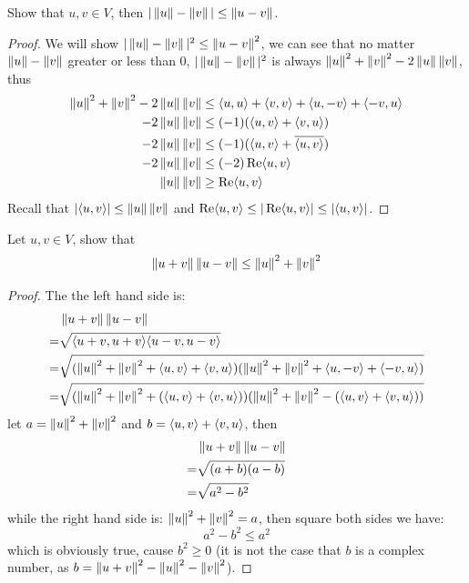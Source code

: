 \documentclass[../main.tex]{subfiles}
\begin{document}
\setcounter{exercise}{19}
\begin{exercise}
  Show that $u, v \in V$, then $|\norm{u} - \norm{v}| \le \norm{u - v}$.
\end{exercise}
\begin{proof}
  We will show $|\norm{u} - \norm{v}|^2 \le \norm{u - v}^2$,
  we can see that no matter $\norm{u} - \norm{v}$ greater or less than $0$,
  $|\norm{u} - \norm{v}|^2$ is always $\norm{u}^2 + \norm{v}^2 - 2\norm{u}\norm{v}$,
  thus
  \begin{align*}
    \norm{u}^2 + \norm{v}^2 - 2\norm{u}\norm{v} & \le \ip{u}{u} + \ip{v}{v} + \ip{u}{- v} + \ip{- v}{u} \\
    - 2\norm{u}\norm{v} & \le (-1) (\ip{u}{v} + \ip{v}{u}) \\
    - 2\norm{u}\norm{v} & \le (-1) (\ip{u}{v} + \overline{\ip{u}{v}}) \\
    - 2\norm{u}\norm{v} & \le (-2) \real \ip{u}{v} \\
    \norm{u}\norm{v} & \ge \real \ip{u}{v} \\
  \end{align*}
  Recall that $|\ip{u}{v}| \le \norm{u}\norm{v}$ and $\real \ip{u}{v} \le |\real \ip{u}{v}| \le |\ip{u}{v}|$.
\end{proof}

\setcounter{exercise}{21}
\begin{exercise}
  Let $u, v \in V$, show that
  \[
  \norm{u + v} \norm{u - v} \le \norm{u}^2 + \norm{v}^2
  \]
\end{exercise}
\begin{proof}
  The the left hand side is:
  \begin{align*}
     & \norm{u + v} \norm{u - v} \\
    =& \sqrt{\ip{u + v}{u + v} \ip{u - v}{u - v}} \\
    =& \sqrt{(\norm{u}^2 + \norm{v}^2 + \ip{u}{v} + \ip{v}{u})(\norm{u}^2 + \norm{v}^2 + \ip{u}{-v} + \ip{-v}{u})} \\
    =& \sqrt{(\norm{u}^2 + \norm{v}^2 + (\ip{u}{v} + \ip{v}{u}))(\norm{u}^2 + \norm{v}^2 - (\ip{u}{v} + \ip{v}{u}))} \\
  \end{align*}
  let $a = \norm{u}^2 + \norm{v}^2$ and $b = \ip{u}{v} + \ip{v}{u}$, then
  \begin{align*}
     & \norm{u + v} \norm{u - v} \\
    =& \sqrt{(a + b)(a - b)} \\
    =& \sqrt{a^2 - b^2} \\
  \end{align*}
  while the right hand side is: $\norm{u}^2 + \norm{v}^2 = a$, then square both sides we have:
  \[
  a^2 - b^2 \le a^2
  \]
  which is obviously true, cause $b^2 \ge 0$ (it is not the case that $b$ is a complex number, as $b = \norm{u + v}^2 - \norm{u}^2 - \norm{v}^2$).
\end{proof}
    
\end{document}
